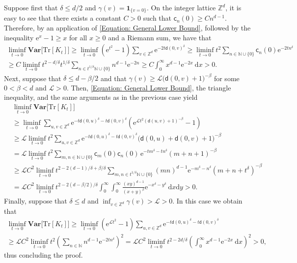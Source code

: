 \documentclass{amsart}
\numberwithin{equation}{section}
\theoremstyle{definition}
\newcommand\be{\beta}
\newcommand\dd{\mathrm d}
\newcommand\de{\delta}
\newcommand\ga{\gamma}
\renewcommand\d{~\mathrm d}
\newcommand\mbb{\mathbb}
\newcommand\mbf{\mathbf}
\newcommand\mc{\mathcal}
\newcommand\mr{\mathrm}
\newcommand\msf{\mathsf}
\begin{document}
Suppose first that $\de\leq d/2$ and $\ga(v)=\mbf 1_{\{v=0\}}$.
On the integer lattice $\mbb Z^d$, it is easy to see that there exists a
constant $C>0$ such that $\msf c_n(0)\geq Cn^{d-1}$.
Therefore,
by an application of \eqref{Equation: General Lower Bound}, followed by
the inequality $\mr e^{x}-1\geq x$ for all $x\geq0$ and a Riemann sum, we have that
\begin{multline*}
\liminf_{t\to0}\mbf{Var}\big[\mr{Tr}[K_t]\big]\geq\liminf_{t\to0}\left(\mr e^{t^2}-1\right)\sum_{v\in\mbb Z^d}\mr e^{-2t\msf d(0,v)^\de}
\geq\liminf_{t\to0}t^2\sum_{n\in\mbb N\cup\{0\}}\msf c_n(0)\mr e^{-2tn^\de}\\
\geq C \liminf_{t\to0}t^{2-d/\de}t^{1/\de}\sum_{n\in t^{1/\de}\mbb N\cup\{0\}}n^{d-1}\mr e^{-2n}
\geq C \int_0^\infty x^{d-1}\mr e^{-2x}\d x>0.
\end{multline*}
Next, suppose that $\de\leq d-\be/2$ and that
$\ga(v)\geq\mc L\big(\msf d(0,v)+1\big)^{-\be}$ for some $0<\be<d$ and $\mc L>0$. Then,
\eqref{Equation: General Lower Bound}, the triangle inequality,
and the same arguments as in the previous case yield
\begin{align*}
&\liminf_{t\to0}\mbf{Var}\big[\mr{Tr}[K_t]\big]\\
&\geq\liminf_{t\to0}\sum_{u,v\in\mbb Z^d}\mr e^{-t\msf d(0,u)^\de-t\msf d(0,v)^\de}
\left(\mr e^{\mc Lt^2(\msf d(u,v)+1)^{-\be}}-1\right)\\
&\geq \mc L \liminf_{t\to0}t^{2}\sum_{u,v\in\mbb Z^d}\mr e^{-t\msf d(0,u)^\de-t\msf d(0,v)^\de}
\big(\msf d(0,u)+\msf d(0,v)+1\big)^{-\be}\\
&=\mc L \liminf_{t\to0}t^{2}\sum_{m,n\in\mbb N\cup\{0\}}\msf c_m(0)\msf c_n(0)\,\mr e^{-tm^\de-tn^\de}(m+n+1)^{-\be}\\
&\geq\mc L C^2\liminf_{t\to0}t^{2-2(d-1)/\de+\be/\de}\sum_{m,n\in t^{1/\de}\mbb N\cup\{0\}}(mn)^{d-1}\mr e^{-m^\de-n^\de}(m+n+t^\de)^{-\be}\\
&=\mc L C^2\liminf_{t\to0}t^{2-2(d-\be/2)/\de}\int_0^\infty\int_0^\infty\frac{(xy)^{d-1}}{(x+y)^\be}\mr e^{-x^\de-y^\de}\d x\dd y>0.
\end{align*}
Finally, suppose that $\de\leq d$ and $\inf_{v\in\mbb Z^d}\ga(v)>\mc L>0$. In this case we obtain that
\begin{multline*}
\liminf_{t\to0}\mbf{Var}\big[\mr{Tr}[K_t]\big]\geq\liminf_{t\to0}\left(\mr e^{\mc Lt^2}-1\right)\sum_{u,v\in\mbb Z^d}\mr e^{-t\msf d(0,u)^\de-t\msf d(0,v)^\de}\\
\geq\mc L C^2\liminf_{t\to0}t^2\left(\sum_{n\in\mbb N}n^{d-1}\mr e^{-2tn^\de}\right)^2
=\mc L C^2\liminf_{t\to0}t^{2-2d/\de}\left(\int_0^\infty x^{d-1}\mr e^{-2x}\d x\right)^2>0,
\end{multline*}
thus concluding the proof.



\end{document}
